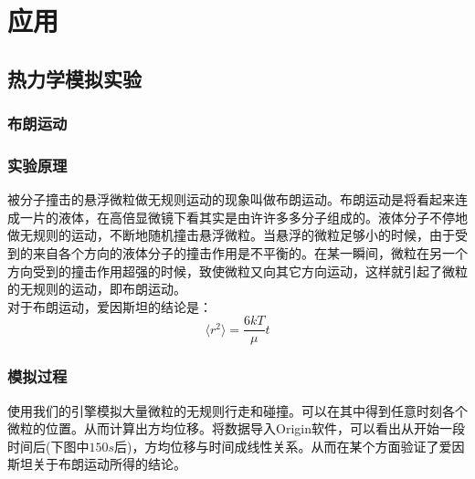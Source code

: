 ﻿\documentclass{article}
\begin{document}
	\section{应用}
	\subsection{热力学模拟实验}
	\subsubsection{布朗运动}
	\subsubsection*{实验原理}
	被分子撞击的悬浮微粒做无规则运动的现象叫做布朗运动。布朗运动是将看起来连成一片的液体，在高倍显微镜下看其实是由许许多多分子组成的。液体分子不停地做无规则的运动，不断地随机撞击悬浮微粒。当悬浮的微粒足够小的时候，由于受到的来自各个方向的液体分子的撞击作用是不平衡的。在某一瞬间，微粒在另一个方向受到的撞击作用超强的时候，致使微粒又向其它方向运动，这样就引起了微粒的无规则的运动，即布朗运动。 \\
	对于布朗运动，爱因斯坦的结论是：
	\[ \langle r^2\rangle = \frac{6kT}{\mu} t \]
	\subsubsection*{模拟过程}
	使用我们的引擎模拟大量微粒的无规则行走和碰撞。可以在其中得到任意时刻各个微粒的位置。从而计算出方均位移。将数据导入Origin软件，可以看出从开始一段时间后(下图中$150s$后)，方均位移与时间成线性关系。从而在某个方面验证了爱因斯坦关于布朗运动所得的结论。
	\begin{figure}[H]
		\centering
	\end{figure}
\end{document}
